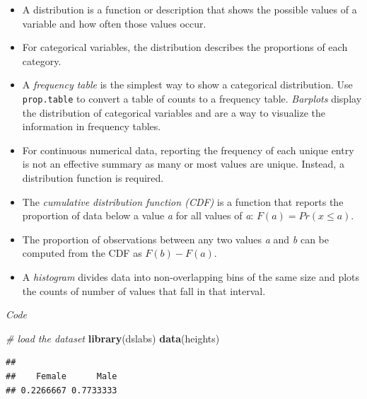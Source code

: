 \documentclass[
]{article}
\newenvironment{Shaded}{\begin{snugshade}}{\end{snugshade}}
\newcommand{\CommentTok}[1]{\textcolor[rgb]{0.56,0.35,0.01}{\textit{#1}}}
\newcommand{\KeywordTok}[1]{\textcolor[rgb]{0.13,0.29,0.53}{\textbf{#1}}}
\newcommand{\NormalTok}[1]{#1}
\newcommand{\OperatorTok}[1]{\textcolor[rgb]{0.81,0.36,0.00}{\textbf{#1}}}
\providecommand{\tightlist}{%
  \setlength{\itemsep}{0pt}\setlength{\parskip}{0pt}}
\begin{document}
\begin{itemize}
\tightlist
\item
  A distribution is a function or description that shows the possible
  values of a variable and how often those values occur.
\item
  For categorical variables, the distribution describes the proportions
  of each category.
\item
  A \emph{frequency table} is the simplest way to show a categorical
  distribution. Use \texttt{prop.table} to convert a table of counts to
  a frequency table. \emph{Barplots} display the distribution of
  categorical variables and are a way to visualize the information in
  frequency tables.
\item
  For continuous numerical data, reporting the frequency of each unique
  entry is not an effective summary as many or most values are unique.
  Instead, a distribution function is required.
\item
  The \emph{cumulative distribution function (CDF)} is a function that
  reports the proportion of data below a value \emph{a} for all values
  of \emph{a}: \(F(a) = Pr(x \le a)\).
\item
  The proportion of observations between any two values \emph{a} and
  \emph{b} can be computed from the CDF as \(F(b) - F(a)\).
\item
  A \emph{histogram} divides data into non-overlapping bins of the same
  size and plots the counts of number of values that fall in that
  interval.
\end{itemize}

\emph{Code}

\begin{Shaded}
\begin{Highlighting}[]
\CommentTok{# load the dataset}
\KeywordTok{library}\NormalTok{(dslabs)}
\KeywordTok{data}\NormalTok{(heights)}
\end{Highlighting}
\end{Shaded}

\begin{Shaded}
\end{Shaded}

\begin{verbatim}
## 
##    Female      Male 
## 0.2266667 0.7733333
\end{verbatim}
\end{document}
